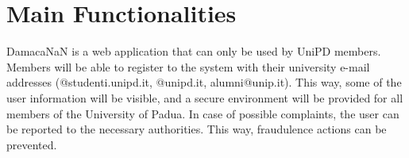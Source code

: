 \section{Main Functionalities}

\hspace{5mm} DamacaNaN is a web application that can only be used by UniPD members. Members will be able to register to the system with their university e-mail addresses (@studenti.unipd.it, @unipd.it, alumni@unip.it). This way, some of the user information will be visible, and a secure environment will be provided for all members of the University of Padua. In case of possible complaints, the user can be reported to the necessary authorities. This way, fraudulence actions can be prevented.\newline

